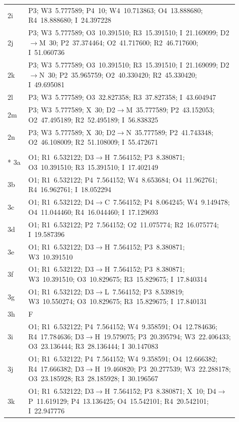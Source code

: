 \documentclass{swmcmthesis}
\begin{document}
\begin{longtable}{@{}l >{\raggedright\arraybackslash}p{0.91\linewidth}@{}}
    2i & P3; W3~5.777589; P4~10; W4~10.713863; O4~13.888680; R4~18.888680; I~24.397228 \\
    2j & P3; W3~5.777589; O3~10.391510; R3~15.391510; I~21.169099; D2$\to$M~30; P2~37.374464; O2~41.717600; R2~46.717600; I~51.060736 \\
    2k & P3; W3~5.777589; O3~10.391510; R3~15.391510; I~21.169099; D2$\to$N~30; P2~35.965759; O2~40.330420; R2~45.330420; I~49.695081 \\
    2l & P3; W3~5.777589; O3~32.827358; R3~37.827358; I~43.604947 \\
    2m & P3; W3~5.777589; X~30; D2$\to$M~35.777589; P2~43.152053; O2~47.495189; R2~52.495189; I~56.838325 \\
    2n & P3; W3~5.777589; X~30; D2$\to$N~35.777589; P2~41.743348; O2~46.108009; R2~51.108009; I~55.472671 \\
    \addlinespace
    \multicolumn{2}{@{}l}{\textbf{Vehicle $V_3$}} \\*
    3a & O1; R1~6.532122; D3$\to$H~7.564152; P3~8.380871; O3~10.391510; R3~15.391510; I~17.402149 \\
    3b & O1; R1~6.532122; P4~7.564152; W4~8.653684; O4~11.962761; R4~16.962761; I~18.052294 \\
    3c & O1; R1~6.532122; D4$\to$C~7.564152; P4~8.064245; W4~9.149478; O4~11.044460; R4~16.044460; I~17.129693 \\
    3d & O1; R1~6.532122; P2~7.564152; O2~11.075774; R2~16.075774; I~19.587396 \\
    3e & O1; R1~6.532122; D3$\to$H~7.564152; P3~8.380871; W3~10.391510 \\
    3f & O1; R1~6.532122; D3$\to$H~7.564152; P3~8.380871; W3~10.391510; O3~10.829675; R3~15.829675; I~17.840314 \\
    3g & O1; R1~6.532122; D3$\to$L~7.564152; P3~8.539819; W3~10.550274; O3~10.829675; R3~15.829675; I~17.840131 \\
    3h & F \\
    3i & O1; R1~6.532122; P4~7.564152; W4~9.358591; O4~12.784636; R4~17.784636; D3$\to$H~19.579075; P3~20.395794; W3~22.406433; O3~23.136444; R3~28.136444; I~30.147083 \\
    3j & O1; R1~6.532122; P4~7.564152; W4~9.358591; O4~12.666382; R4~17.666382; D3$\to$H~19.460820; P3~20.277539; W3~22.288178; O3~23.185928; R3~28.185928; I~30.196567 \\
    3k & O1; R1~6.532122; D3$\to$H~7.564152; P3~8.380871; X~10; D4$\to$P~11.619129; P4~13.136425; O4~15.542101; R4~20.542101; I~22.947776 \\

\end{longtable}
\end{document}
